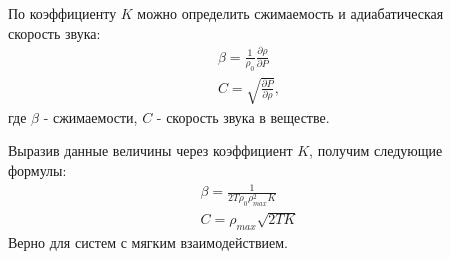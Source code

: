 \documentclass[pdf,hyperref={unicode}]{beamer}
\begin{document}
\begin{frame}
\begin{columns}
\begin{column}{0.6\linewidth}
\end{column}

\begin{column}{0.45\linewidth}
\tiny{
По коэффициенту $K$ можно определить сжимаемость и адиабатическая скорость звука:
\begin{equation}
\begin{aligned}
\beta = \frac{1}{\rho_0} \frac{\partial \rho}{\partial P} \\
C = \sqrt{\frac{\partial P}{\partial \rho}},
\end{aligned}
\label{eqCBeta}
\end{equation}
где $\beta$ - сжимаемости, $C$ - скорость звука в веществе.

Выразив данные величины через коэффициент $K$, получим следующие формулы:
\begin{equation}
\begin{aligned}
\beta = \frac{1}{2T\rho_0\rho_{max}^2K}\\
C = \rho_{max}\sqrt{2TK}
\end{aligned}
\label{eqCBetaK}
\end{equation}
Верно для систем с мягким взаимодействием. 
}
\end{column}

\end{columns}
\end{frame}
\end{document}
